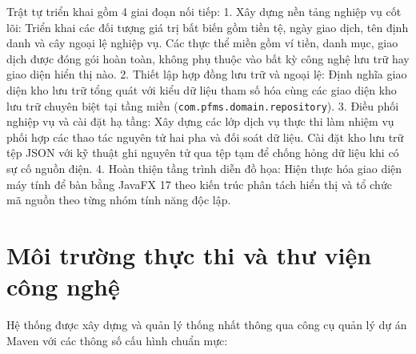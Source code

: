 \documentclass[a4paper,12pt]{report}
\newcommand{\passthrough}[1]{#1}
\begin{document}
Trật tự triển khai gồm 4 giai đoạn nối tiếp: 1. Xây dựng nền tảng nghiệp
vụ cốt lõi: Triển khai các đối tượng giá trị bất biến gồm tiền tệ, ngày
giao dịch, tên định danh và cây ngoại lệ nghiệp vụ. Các thực thể miền
gồm ví tiền, danh mục, giao dịch được đóng gói hoàn toàn, không phụ
thuộc vào bất kỳ công nghệ lưu trữ hay giao diện hiển thị nào. 2. Thiết
lập hợp đồng lưu trữ và ngoại lệ: Định nghĩa giao diện kho lưu trữ tổng
quát với kiểu dữ liệu tham số hóa cùng các giao diện kho lưu trữ chuyên
biệt tại tầng miền
(\passthrough{\lstinline!com.pfms.domain.repository!}). 3. Điều phối
nghiệp vụ và cài đặt hạ tầng: Xây dựng các lớp dịch vụ thực thi làm
nhiệm vụ phối hợp các thao tác nguyên tử hai pha và đối soát dữ liệu.
Cài đặt kho lưu trữ tệp JSON với kỹ thuật ghi nguyên tử qua tệp tạm để
chống hỏng dữ liệu khi có sự cố nguồn điện. 4. Hoàn thiện tầng trình
diễn đồ họa: Hiện thực hóa giao diện máy tính để bàn bằng JavaFX 17 theo
kiến trúc phân tách hiển thị và tổ chức mã nguồn theo từng nhóm tính
năng độc lập.

\section{Môi trường thực thi và thư viện công
nghệ}\label{muxf4i-trux1b0ux1eddng-thux1ef1c-thi-vuxe0-thux1b0-viux1ec7n-cuxf4ng-nghux1ec7}

Hệ thống được xây dựng và quản lý thống nhất thông qua công cụ quản lý
dự án Maven với các thông số cấu hình chuẩn mực:
\end{document}
